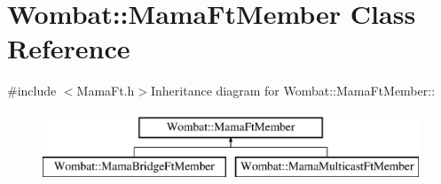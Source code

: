 \hypertarget{classWombat_1_1MamaFtMember}{
\section{Wombat::MamaFtMember Class Reference}
\label{classWombat_1_1MamaFtMember}
}


{\ttfamily \#include $<$MamaFt.h$>$}Inheritance diagram for Wombat::MamaFtMember::\begin{figure}[H]
\begin{center}
\leavevmode
\includegraphics[height=2cm]{classWombat_1_1MamaFtMember}
\end{center}
\end{figure}
